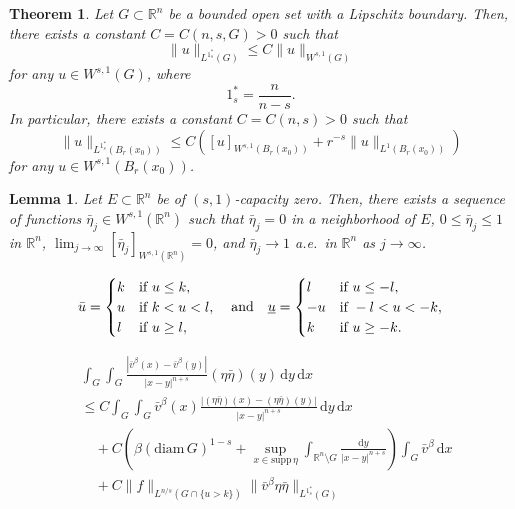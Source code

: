 \documentclass[10pt,a4paper]{amsart}
\newtheorem{theorem}{Theorem}
\newtheorem{lemma}{Lemma}
\begin{document}
\begin{theorem}\label{thm-FSI}
Let $G \subset \mathbb{R}^n$ be a bounded open set with a Lipschitz boundary. Then, there exists a constant $C=C(n, s, G)>0$ such that
\begin{equation*}
\|u\|_{L^{1^{\ast}_s}(G)} \leq C \|u\|_{W^{s, 1}(G)}
\end{equation*}
for any $u \in W^{s, 1}(G)$, where
\begin{equation}\label{eq-1-ast}
1^{\ast}_s=\frac{n}{n-s}.
\end{equation}
In particular, there exists a constant $C=C(n, s)>0$ such that
\begin{equation*}
\|u\|_{L^{1^{\ast}_s}(B_r(x_0))} \leq C \left( [u]_{W^{s, 1}(B_r(x_0))} + r^{-s} \|u\|_{L^1(B_r(x_0))} \right)
\end{equation*}
for any $u \in W^{s, 1}(B_r(x_0))$.
\end{theorem}

\begin{lemma}\label{lem-cap-zero}
Let $E \subset \mathbb{R}^n$ be of $(s, 1)$-capacity zero. Then, there exists a sequence of functions $\bar{\eta}_j \in W^{s, 1}(\mathbb{R}^n)$ such that $\bar{\eta}_j=0$ in a neighborhood of $E$, $0 \leq \bar{\eta}_j \leq 1$ in $\mathbb{R}^n$, $\lim_{j\to \infty} [\bar{\eta}_j]_{W^{s, 1}(\mathbb{R}^n)} = 0$, and $\bar{\eta}_j \to 1$ a.e.\ in $\mathbb{R}^n$ as $j \to \infty$.
\end{lemma}

\begin{equation}\label{eq-truncation}
\bar{u}=
\begin{cases}
k &\text{if } u \leq k, \\
u &\text{if } k < u < l, \\
l &\text{if } u \geq l,
\end{cases}
\quad\text{and}\quad
\underbar{$u$}=
\begin{cases}
l &\text{if } u \leq -l, \\
-u &\text{if } -l < u < -k, \\
k &\text{if } u \geq -k.
\end{cases}
\end{equation}

\begin{equation}\label{eq-Caccio1-sub}
\begin{split}
&\int_{G} \int_{G} \frac{|\bar{v}^\beta(x) - \bar{v}^\beta(y)|}{|x-y|^{n+s}} (\eta\bar{\eta})(y) \,\mathrm{d}y \,\mathrm{d}x \\
&\leq C \int_{G} \int_{G} \bar{v}^\beta(x) \frac{|(\eta\bar{\eta})(x)-(\eta\bar{\eta})(y)|}{|x-y|^{n+s}} \,\mathrm{d}y \,\mathrm{d}x \\
&\quad + C \left( \beta (\mathrm{diam}\, G)^{1-s} + \sup_{x \in \mathrm{supp}\,\eta} \int_{\mathbb{R}^n \setminus G} \frac{\mathrm{d}y}{|x-y|^{n+s}} \right) \int_G \bar{v}^\beta \,\mathrm{d}x \\
&\quad + C \|f\|_{L^{n/s}(G \cap \{u>k\})} \|\bar{v}^\beta\eta\bar{\eta}\|_{L^{1^{\ast}_s}(G)}
\end{split}
\end{equation}
\end{document}
